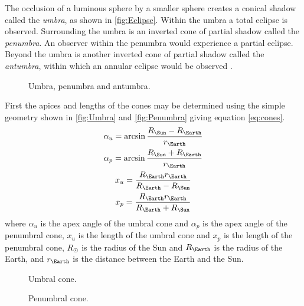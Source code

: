 The occlusion of a luminous sphere by a smaller sphere creates a conical shadow called the \emph{umbra}, as shown in \autoref{fig:Eclipse}. Within the umbra a total eclipse is observed. Surrounding the umbra is an inverted cone of partial shadow called the \emph{penumbra}. An observer within the penumbra would experience a partial eclipse. Beyond the umbra is another inverted cone of partial shadow called the \emph{antumbra}, within which an annular eclipse would be observed \parencite{Longo1995}.

\begin{figure}
\centering
\def\svgwidth{0.85\textwidth}

\caption{Umbra, penumbra and antumbra.} \label{fig:Eclipse}
\end{figure}

First the apices and lengths of the cones may be determined using the simple geometry shown in \autoref{fig:Umbra} and \autoref{fig:Penumbra} giving equation \eqref{eq:cones}.
\begin{subequations} \label{eq:cones}
\begin{gather}
\alpha_u = \arcsin\frac{R_\Sun-R_\Earth}{r_\Earth} \\
\alpha_p = \arcsin\frac{R_\Sun+R_\Earth}{r_\Earth} \\
x_u = \frac{R_\Earth r_\Earth}{R_\Earth-R_\Sun} \\
x_p = \frac{R_\Earth r_\Earth}{R_\Earth+R_\Sun}
\end{gather}
\end{subequations}
where $\alpha_u$ is the apex angle of the umbral cone and $\alpha_p$ is the apex angle of the penumbral cone, $x_u$ is the length of the umbral cone and $x_p$ is the length of the penumbral cone, $R_\Sun$ is the radius of the Sun and $R_\Earth$ is the radius of the Earth, and $r_\Earth$ is the distance between the Earth and the Sun.

\begin{figure}
\centering
\def\svgwidth{0.6\textwidth}

\caption{Umbral cone.} \label{fig:Umbra}
\end{figure}

\begin{figure}
\centering
\def\svgwidth{0.6\textwidth}

\caption{Penumbral cone.} \label{fig:Penumbra}
\end{figure}


